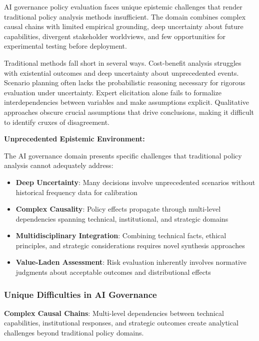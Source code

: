 \documentclass[
  11pt,
  letterpaper,
]{book}
\providecommand{\tightlist}{%
  \setlength{\itemsep}{0pt}\setlength{\parskip}{0pt}}
\begin{document}
AI governance policy evaluation faces unique epistemic challenges that
render traditional policy analysis methods insufficient. The domain
combines complex causal chains with limited empirical grounding, deep
uncertainty about future capabilities, divergent stakeholder worldviews,
and few opportunities for experimental testing before deployment.

Traditional methods fall short in several ways. Cost-benefit analysis
struggles with existential outcomes and deep uncertainty about
unprecedented events. Scenario planning often lacks the probabilistic
reasoning necessary for rigorous evaluation under uncertainty. Expert
elicitation alone fails to formalize interdependencies between variables
and make assumptions explicit. Qualitative approaches obscure crucial
assumptions that drive conclusions, making it difficult to identify
cruxes of disagreement.

\textbf{Unprecedented Epistemic Environment:}

The AI governance domain presents specific challenges that traditional
policy analysis cannot adequately address:

\begin{itemize}
\tightlist
\item
  \textbf{Deep Uncertainty}: Many decisions involve unprecedented
  scenarios without historical frequency data for calibration
\item
  \textbf{Complex Causality}: Policy effects propagate through
  multi-level dependencies spanning technical, institutional, and
  strategic domains
\item
  \textbf{Multidisciplinary Integration}: Combining technical facts,
  ethical principles, and strategic considerations requires novel
  synthesis approaches
\item
  \textbf{Value-Laden Assessment}: Risk evaluation inherently involves
  normative judgments about acceptable outcomes and distributional
  effects
\end{itemize}

\subsubsection{Unique Difficulties in AI
Governance}\label{sec-unique-difficulties}

\textbf{Complex Causal Chains}: Multi-level dependencies between
technical capabilities, institutional responses, and strategic outcomes
create analytical challenges beyond traditional policy domains.
\end{document}
